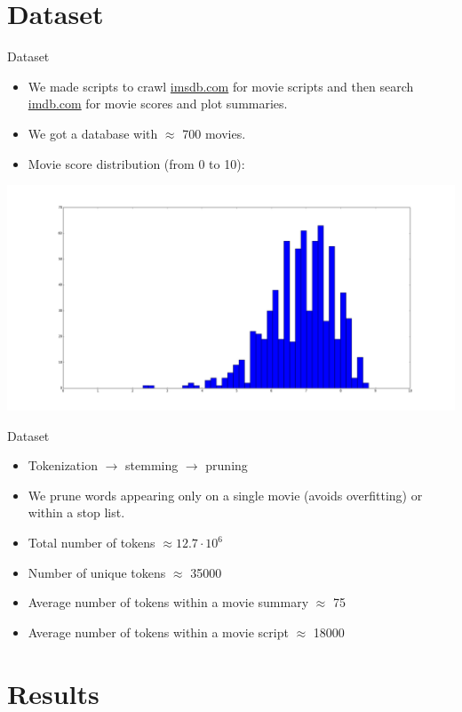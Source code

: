 \documentclass{beamer}
\begin{document}
\section{Dataset}

\begin{frame}{Dataset}
	\begin{itemize}
	\item We made scripts to crawl \url{imsdb.com} for movie scripts and then search \url{imdb.com} for movie scores and plot summaries.
	\item We got a database with $\approx$ 700 movies.
	\item Movie score distribution (from 0 to 10):
	\end{itemize}

	\includegraphics[width=\textwidth]{scores_histogram.png}
\end{frame}

\begin{frame}{Dataset}
	\begin{itemize}
	\item Tokenization $\rightarrow$ stemming $\rightarrow$ pruning
	\item We prune words appearing only on a single movie (avoids overfitting) or within a stop list.
	\item Total number of tokens $\approx 12.7 \cdot 10^6$
	\item Number of unique tokens $\approx$ 35000
	\item Average number of tokens within a movie summary $\approx$ 75
	\item Average number of tokens within a movie script $\approx$ 18000
	\end{itemize}
\end{frame}

\section{Results}
\end{document}
